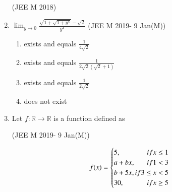 \documentclass[journal,12pt,twocolumn]{IEEEtran}
\theoremstyle{remark}
\begin{document}
\begin{enumerate}[start=36]
	\hfill{(JEE M 2018)}
	\begin{enumerate}
	\end{enumerate}
	\item  
	$\lim_{y\to0} \frac{\sqrt{1+\sqrt{1+y^4}}-\sqrt{2}}{y^4} $
	\hfill{(JEE M 2019- 9 Jan(M))}
	\begin{enumerate}
		\item exists and equals $\frac{1}{4\sqrt{2}}$
		\item exists and equals $\frac{1}{2\sqrt{2}(\sqrt{2}+1)}$
		\item exists and equals $\frac{1}{2\sqrt{2}}$
		\item does not exist
	\end{enumerate}
\item Let $f : \mathbb{R}\to\mathbb{R}$ is a function defined as

	\hfill{(JEE M 2019- 9 Jan(M))}

	\begin{equation}
	    f(x)= 
	    \begin{cases}
	    5, \hfill{if x \le 1}\\
	    a + bx, \hfill{if 1 < 3}\\
	    b + 5x, \hfill{if 3 \le x < 5}\\
	    30, \hfill{if x \ge 5}
	    \end{cases}
	\end{equation}


\end{enumerate}
\end{document}
